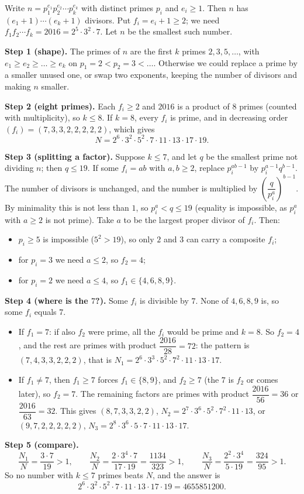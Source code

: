 Write $n=p_1^{e_1}p_2^{e_2}\cdots p_k^{e_k}$ with distinct primes $p_i$ and $e_i\ge1$. Then $n$ has $(e_1+1)\cdots(e_k+1)$ divisors. Put $f_i=e_i+1\ge2$; we need $f_1f_2\cdots f_k=2016=2^5\cdot3^2\cdot7$. Let $n$ be the smallest such number.

\textbf{Step 1 (shape).} The primes of $n$ are the first $k$ primes $2,3,5,\dots$, with $e_1\ge e_2\ge\dots\ge e_k$ on $p_1=2<p_2=3<\dots$. Otherwise we could replace a prime by a smaller unused one, or swap two exponents, keeping the number of divisors and making $n$ smaller.

\textbf{Step 2 (eight primes).} Each $f_i\ge2$ and $2016$ is a product of $8$ primes (counted with multiplicity), so $k\le8$. If $k=8$, every $f_i$ is prime, and in decreasing order $(f_i)=(7,3,3,2,2,2,2,2)$, which gives
\[
N=2^6\cdot3^2\cdot5^2\cdot7\cdot11\cdot13\cdot17\cdot19 .
\]

\textbf{Step 3 (splitting a factor).} Suppose $k\le7$, and let $q$ be the smallest prime not dividing $n$; then $q\le19$. If some $f_i=ab$ with $a,b\ge2$, replace $p_i^{ab-1}$ by $p_i^{a-1}q^{b-1}$. The number of divisors is unchanged, and the number is multiplied by $\left(\dfrac{q}{p_i^{a}}\right)^{b-1}$. By minimality this is not less than $1$, so $p_i^a<q\le19$ (equality is impossible, as $p_i^a$ with $a\ge2$ is not prime). Take $a$ to be the largest proper divisor of $f_i$. Then:
\begin{itemize}
\item $p_i\ge5$ is impossible ($5^2>19$), so only $2$ and $3$ can carry a composite $f_i$;
\item for $p_i=3$ we need $a\le2$, so $f_2=4$;
\item for $p_i=2$ we need $a\le4$, so $f_1\in\{4,6,8,9\}$.
\end{itemize}

\textbf{Step 4 (where is the $7$?).} Some $f_i$ is divisible by $7$. None of $4,6,8,9$ is, so some $f_i$ equals $7$.
\begin{itemize}
\item If $f_1=7$: if also $f_2$ were prime, all the $f_i$ would be prime and $k=8$. So $f_2=4$, and the rest are primes with product $\dfrac{2016}{28}=72$: the pattern is $(7,4,3,3,2,2,2)$, that is $N_1=2^6\cdot3^3\cdot5^2\cdot7^2\cdot11\cdot13\cdot17$.
\item If $f_1\ne7$, then $f_1\ge7$ forces $f_1\in\{8,9\}$, and $f_2\ge7$ (the $7$ is $f_2$ or comes later), so $f_2=7$. The remaining factors are primes with product $\dfrac{2016}{56}=36$ or $\dfrac{2016}{63}=32$. This gives $(8,7,3,3,2,2)$, $N_2=2^7\cdot3^6\cdot5^2\cdot7^2\cdot11\cdot13$, or $(9,7,2,2,2,2,2)$, $N_3=2^8\cdot3^6\cdot5\cdot7\cdot11\cdot13\cdot17$.
\end{itemize}

\textbf{Step 5 (compare).}
\[
\dfrac{N_1}{N}=\dfrac{3\cdot7}{19}>1,\qquad \dfrac{N_2}{N}=\dfrac{2\cdot3^4\cdot7}{17\cdot19}=\dfrac{1134}{323}>1,\qquad \dfrac{N_3}{N}=\dfrac{2^2\cdot3^4}{5\cdot19}=\dfrac{324}{95}>1 .
\]
So no number with $k\le7$ primes beats $N$, and the answer is
\[
\boxed{2^6\cdot3^2\cdot5^2\cdot7\cdot11\cdot13\cdot17\cdot19}=4655851200 .
\]
